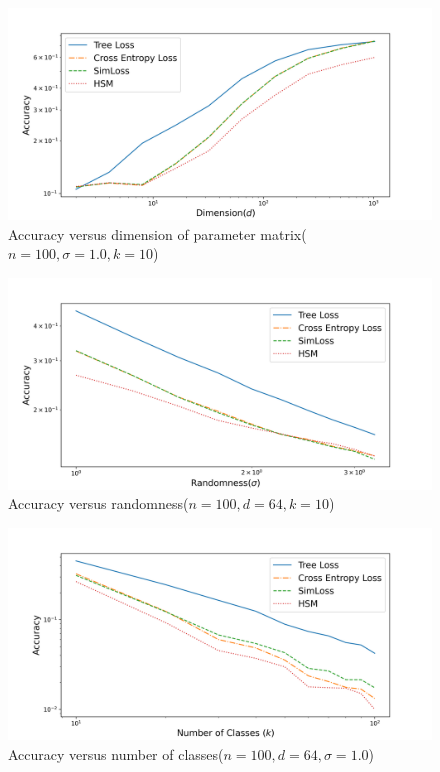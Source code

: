 \documentclass[twoside]{article}
\begin{document}
\begin{figure}[h]
\vspace{.3in}
\includegraphics[width=\linewidth]{fig/images/accuracy_vs_d.png}
\vspace{.3in}
\caption{\small Accuracy versus dimension of parameter matrix($n=100, \sigma=1.0, k=10$)}
\label{accuracy_vs_d}
\end{figure}

\begin{figure}[h]
\vspace{.3in}
\includegraphics[width=\linewidth]{fig/images/accuracy_vs_sigma.png}
\vspace{.3in}
\caption{\small Accuracy versus randomness($n=100, d=64, k=10$)}
\label{accuracy_vs_sigma}
\end{figure}

\begin{figure}[h]
\vspace{.3in}
\includegraphics[width=\linewidth]{fig/images/accuracy_vs_class.png}
\vspace{.3in}
\caption{\small Accuracy versus number of classes($n=100, d=64, \sigma=1.0$)}
\label{accuracy_vs_class}
\end{figure} 
\end{document}
